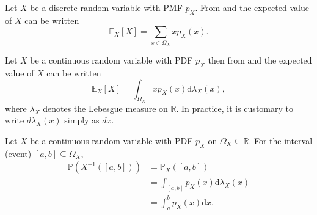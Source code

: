 \begin{remark}
	\label{rem:expected_value_discrete}
	Let $X$ be a discrete random variable with PMF $p_X$. From  and  the expected value of $X$ can be written
	\begin{equation}
		\mathbb{E}_X[X]=\sum_{x\in \Omega_X} x p_X(x).
		\label{eq:discrete_exp}
	\end{equation}
\end{remark}

\begin{remark}
	\label{remark:expectation_continuous}
	Let $X$ be a continuous random variable with PDF $p_X$ then from  and  the expected value of $X$ can be written
	\begin{equation}
		\mathbb{E}_X[X] = \int_{\Omega_X} x p_X(x) \mathrm{d}\lambda_X(x),
	\end{equation}
	where $\lambda_X$ denotes the Lebesgue measure on $\mathbb{R}$. In practice, it is customary to write $d\lambda_X(x)$ simply as $dx$.
\end{remark}


\begin{example}
	Let $X$ be a continuous random variable with PDF $p_X$ on $\Omega_X\subseteq \mathbb{R}$. For the interval (event) $[a,b] \subseteq \Omega_X$,
	\begin{equation}
		\begin{split}
			\mathbb{P}(X^{-1}([a,b])) 
			&= \mathbb{P}_X([a,b])\\ 
			&= \int_{[a,b]} p_X(x) \mathrm{d}\lambda_X(x)\\ 
			&= \int_a^b p_X(x) \mathrm{d}x.
		\end{split}
	\end{equation}
\end{example}

